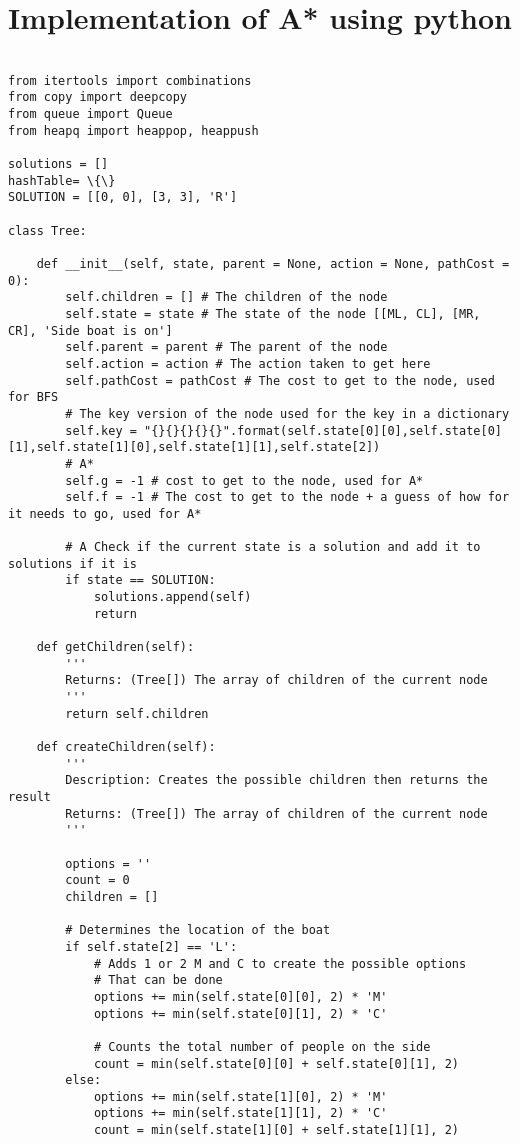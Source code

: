 \documentclass{article}
\begin{document}
\section{Implementation of A* using python}
\begin{verbatim}

from itertools import combinations
from copy import deepcopy
from queue import Queue
from heapq import heappop, heappush

solutions = []
hashTable= \{\}
SOLUTION = [[0, 0], [3, 3], 'R']

class Tree:

    def __init__(self, state, parent = None, action = None, pathCost = 0):
        self.children = [] # The children of the node 
        self.state = state # The state of the node [[ML, CL], [MR, CR], 'Side boat is on']
        self.parent = parent # The parent of the node
        self.action = action # The action taken to get here
        self.pathCost = pathCost # The cost to get to the node, used for BFS
        # The key version of the node used for the key in a dictionary
        self.key = "{}{}{}{}{}".format(self.state[0][0],self.state[0][1],self.state[1][0],self.state[1][1],self.state[2])
        # A*
        self.g = -1 # cost to get to the node, used for A*
        self.f = -1 # The cost to get to the node + a guess of how for it needs to go, used for A*

        # A Check if the current state is a solution and add it to solutions if it is
        if state == SOLUTION:
            solutions.append(self)
            return
    
    def getChildren(self):
        '''
        Returns: (Tree[]) The array of children of the current node
        '''
        return self.children

    def createChildren(self):
        '''
        Description: Creates the possible children then returns the result
        Returns: (Tree[]) The array of children of the current node
        '''

        options = ''
        count = 0
        children = []

        # Determines the location of the boat
        if self.state[2] == 'L':
            # Adds 1 or 2 M and C to create the possible options
            # That can be done
            options += min(self.state[0][0], 2) * 'M'
            options += min(self.state[0][1], 2) * 'C'

            # Counts the total number of people on the side
            count = min(self.state[0][0] + self.state[0][1], 2)
        else:
            options += min(self.state[1][0], 2) * 'M'
            options += min(self.state[1][1], 2) * 'C'
            count = min(self.state[1][0] + self.state[1][1], 2)


\end{verbatim}
\end{document}
